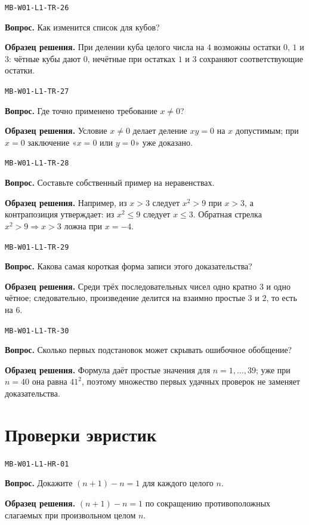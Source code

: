 \documentclass[11pt,a4paper,openany]{book}
\newcommand{\muid}[1]{\texttt{\footnotesize #1}}
\begin{document}
\noindent\muid{MB-W01-L1-TR-26}\par \textbf{Вопрос.} Как изменится список для кубов?\par 
\textbf{Образец решения.} При делении куба целого числа на $4$ возможны остатки $0$, $1$ и $3$: чётные кубы дают $0$, нечётные при остатках $1$ и $3$ сохраняют соответствующие остатки.\medskip

\noindent\muid{MB-W01-L1-TR-27}\par \textbf{Вопрос.} Где точно применено требование $x\ne0$?\par 
\textbf{Образец решения.} Условие $x\ne0$ делает деление $xy=0$ на $x$ допустимым; при $x=0$ заключение «$x=0$ или $y=0$» уже доказано.\medskip

\noindent\muid{MB-W01-L1-TR-28}\par \textbf{Вопрос.} Составьте собственный пример на неравенствах.\par 
\textbf{Образец решения.} Например, из $x>3$ следует $x^2>9$ при $x>3$, а контрапозиция утверждает: из $x^2\le9$ следует $x\le3$. Обратная стрелка $x^2>9\Rightarrow x>3$ ложна при $x=-4$.\medskip

\noindent\muid{MB-W01-L1-TR-29}\par \textbf{Вопрос.} Какова самая короткая форма записи этого доказательства?\par 
\textbf{Образец решения.} Среди трёх последовательных чисел одно кратно $3$ и одно чётное; следовательно, произведение делится на взаимно простые $3$ и $2$, то есть на $6$.\medskip

\noindent\muid{MB-W01-L1-TR-30}\par \textbf{Вопрос.} Сколько первых подстановок может скрывать ошибочное обобщение?\par 
\textbf{Образец решения.} Формула даёт простые значения для $n=1,\ldots,39$; уже при $n=40$ она равна $41^2$, поэтому множество первых удачных проверок не заменяет доказательства.\medskip

\section{Проверки эвристик}

\noindent\muid{MB-W01-L1-HR-01}\par \textbf{Вопрос.} Докажите $(n+1)-n=1$ для каждого целого $n$.\par 
\textbf{Образец решения.} $(n+1)-n=1$ по сокращению противоположных слагаемых при произвольном целом $n$.\medskip
\end{document}
